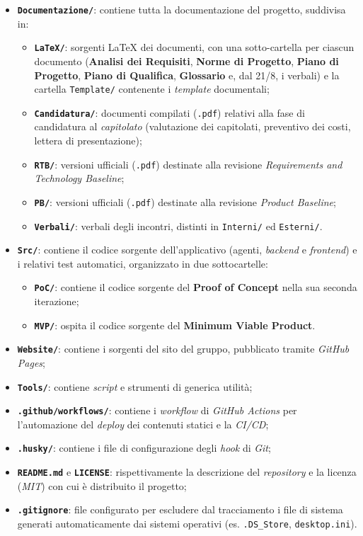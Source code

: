 \documentclass[12pt, a4paper]{article}
\begin{document}
\begin{itemize}
    \item \textbf{\texttt{Documentazione/}}: contiene tutta la documentazione del progetto, suddivisa in:
    \begin{itemize}
        \item \textbf{\texttt{LaTeX/}}: sorgenti \LaTeX{} dei documenti, con una sotto-cartella per ciascun documento (\textbf{Analisi dei Requisiti}, \textbf{Norme di Progetto}, \textbf{Piano di Progetto}, \textbf{Piano di Qualifica}, \textbf{Glossario} e, dal 21/8, i verbali) e la cartella \texttt{Template/} contenente i \textit{template} documentali;
        \item \textbf{\texttt{Candidatura/}}: documenti compilati (\texttt{.pdf}) relativi alla fase di candidatura al \textit{capitolato} (valutazione dei capitolati, preventivo dei costi, lettera di presentazione);
        \item \textbf{\texttt{RTB/}}: versioni ufficiali (\texttt{.pdf}) destinate alla revisione \textit{Requirements and Technology Baseline};
        \item \textbf{\texttt{PB/}}: versioni ufficiali (\texttt{.pdf}) destinate alla revisione \textit{Product Baseline};
        \item \textbf{\texttt{Verbali/}}: verbali degli incontri, distinti in \texttt{Interni/} ed \texttt{Esterni/}.
    \end{itemize}
    \item \textbf{\texttt{Src/}}: contiene il codice sorgente dell'applicativo (agenti, \textit{backend} e \textit{frontend}) e i relativi test automatici, organizzato in due sottocartelle:
        \begin{itemize}
            \item \textbf{\texttt{PoC/}}: contiene il codice sorgente del \textbf{Proof of Concept} nella sua seconda iterazione;
            \item \textbf{\texttt{MVP/}}: ospita il codice sorgente del \textbf{Minimum Viable Product}.
        \end{itemize}
    \item \textbf{\texttt{Website/}}: contiene i sorgenti del sito del gruppo, pubblicato tramite \textit{GitHub Pages};
    \item \textbf{\texttt{Tools/}}: contiene \textit{script} e strumenti di generica utilità;
    \item \textbf{\texttt{.github/workflows/}}: contiene i \textit{workflow} di \textit{GitHub Actions} per l'automazione del \textit{deploy} dei contenuti statici e la \textit{CI/CD};
    \item \textbf{\texttt{.husky/}}: contiene i file di configurazione degli \textit{hook} di \textit{Git};
    \item \textbf{\texttt{README.md}} e \textbf{\texttt{LICENSE}}: rispettivamente la descrizione del \textit{repository} e la licenza (\textit{MIT}) con cui è distribuito il progetto;
    \item \textbf{\texttt{.gitignore}}: file configurato per escludere dal tracciamento i file di sistema generati automaticamente dai sistemi operativi (es. \texttt{.DS\_Store}, \texttt{desktop.ini}).
\end{itemize}
\end{document}
